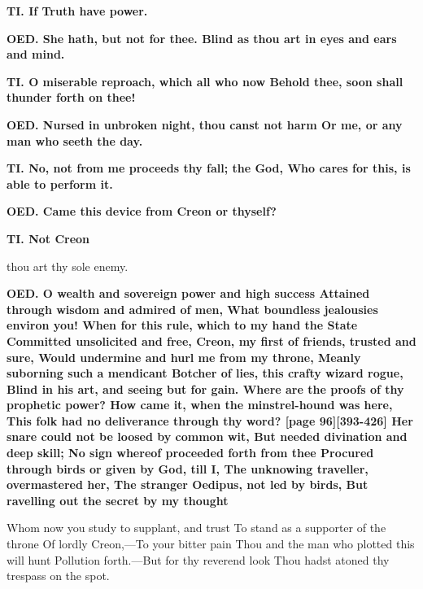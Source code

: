 \documentclass[11pt,letter]{book}
\begin{document}
\par \textbf{TI. If Truth have power.}
\par 

\par \textbf{OED. She hath, but not for thee. Blind as thou art in eyes and ears and mind.}
\par 

\par \textbf{TI. O miserable reproach, which all who now Behold thee, soon shall thunder forth on thee!}
\par 

\par \textbf{OED. Nursed in unbroken night, thou canst not harm Or me, or any man who seeth the day.}
\par 

\par \textbf{TI. No, not from me proceeds thy fall; the God, Who cares for this, is able to perform it.}
\par 

\par \textbf{OED. Came this device from Creon or thyself?}
\par 

\par \textbf{TI. Not Creon}
\par   thou art thy sole enemy.

\par \textbf{OED. O wealth and sovereign power and high success Attained through wisdom and admired of men, What boundless jealousies environ you! When for this rule, which to my hand the State Committed unsolicited and free, Creon, my first of friends, trusted and sure, Would undermine and hurl me from my throne, Meanly suborning such a mendicant Botcher of lies, this crafty wizard rogue, Blind in his art, and seeing but for gain. Where are the proofs of thy prophetic power? How came it, when the minstrel-hound was here, This folk had no deliverance through thy word? [page 96][393-426] Her snare could not be loosed by common wit, But needed divination and deep skill; No sign whereof proceeded forth from thee Procured through birds or given by God, till I, The unknowing traveller, overmastered her, The stranger Oedipus, not led by birds, But ravelling out the secret by my thought}
\par   Whom now you study to supplant, and trust To stand as a supporter of the throne Of lordly Creon,—To your bitter pain Thou and the man who plotted this will hunt Pollution forth.—But for thy reverend look Thou hadst atoned thy trespass on the spot.
\end{document}
